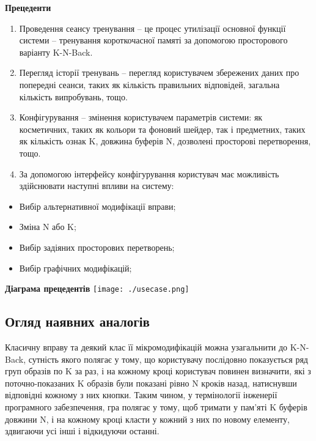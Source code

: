 \begin{center}
  \textbf{Прецеденти}
\end{center}

\begin{enumerate}
  \item Проведення сеансу тренування – це процес утилізації основної функції системи – тренування короткочасної памяті за допомогою просторового варіанту K-N-Back.
  \item Перегляд історії тренувань – перегляд користувачем збережених даних про попередні сеанси, таких як кількість правильних відповідей, загальна кількість випробувань, тощо.
  \item Конфігурування – змінення користувачем параметрів системи: як косметичних, таких як кольори та фоновий шейдер, так і предметних, таких як кількість ознак K, довжина буферів N, дозволені просторові перетворення, тощо.
  \item За допомогою інтерфейсу конфігурування користувач має 	можливість здійснювати наступні впливи на систему:
\end{enumerate}

\begin{itemize}
  \item Вибір альтернативної модифікації вправи;
  \item Зміна N або K;
  \item Вибір задіяних просторових перетворень;
  \item Вибір графічних модифікацій;
\end{itemize}

\begin{center}
  \textbf{Діаграма прецедентів}
  \texttt{[image: ./usecase.png]}
\end{center}

\subsection{Огляд наявних аналогів}

Класичну вправу та деякий клас її мікромодифікацій можна узагальнити до K-N-Back, сутність якого полягає у тому, що користувачу послідовно показується ряд груп образів по K за раз, і на кожному кроці користувач повинен визначити, які з поточно-показаних K образів були показані рівно N кроків назад, натиснувши відповідні кожному з них кнопки. Таким чином, у термінології інженерії програмного забезпечення, гра полягає у тому, щоб тримати у пам'яті K буферів довжини N, і на кожному кроці класти у кожний з них по новому елементу, здвигаючи усі інші і відкидуючи останні.

